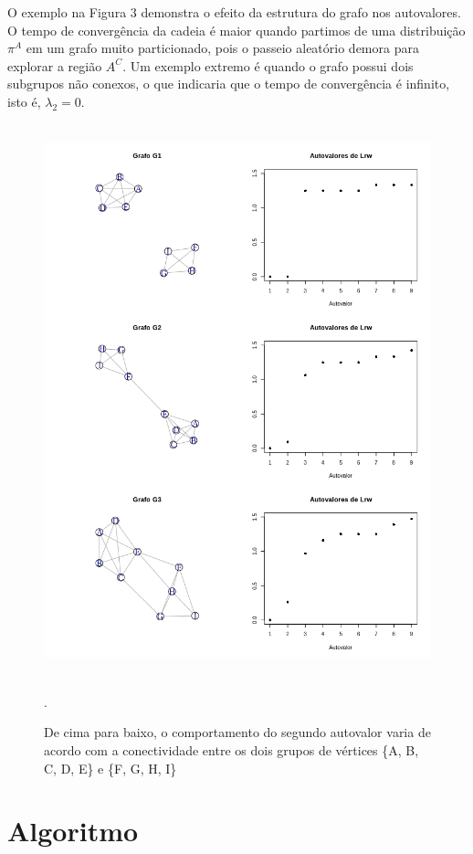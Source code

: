 \documentclass[]{article}
\begin{document}
O exemplo na Figura 3 demonstra o efeito da estrutura do grafo nos autovalores. O tempo de convergência da cadeia é maior quando partimos de uma distribuição $\pi^A$ em um grafo muito particionado, pois o passeio aleatório demora para explorar a região $A^C$. Um exemplo extremo é quando o grafo possui dois subgrupos não conexos, o que indicaria que o tempo de convergência é infinito, isto é, $\lambda_2 = 0$.

\begin{figure}
\includegraphics[width=13cm,height=16cm]{grafo_just}
\caption{De cima para baixo, o comportamento do segundo autovalor varia de acordo com a conectividade entre os dois grupos de vértices \{A, B, C, D, E\} e \{F, G, H, I\}}.
\end{figure}

\newpage
\section{Algoritmo}
\end{document}
